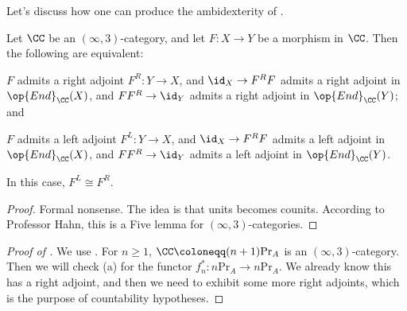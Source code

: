 \documentclass[../notes.tex]{subfiles}
\begin{document}
Let's discuss how one can produce the ambidexterity of .
\begin{proposition} \label{prop:get-ambi}
	Let $\CC$ be an $(\infty,3)$-category, and let $F\colon X\to Y$ be a morphism in $\CC$. Then the following are equivalent:
	\begin{listroman}
		\item $F$ admits a right adjoint $F^R\colon Y\to X$, and ${\id_X}\to F^RF$ admits a right adjoint in $\op{End}_\CC(X)$, and $FF^R\to\id_Y$ admits a right adjoint in $\op{End}_\CC(Y)$; and
		\item $F$ admits a left adjoint $F^L\colon Y\to X$, and ${\id_X}\to F^RF$ admits a left adjoint in $\op{End}_\CC(X)$, and $FF^R\to\id_Y$ admits a left adjoint in $\op{End}_\CC(Y)$.
	\end{listroman}
	In this case, $F^L\cong F^R$.
\end{proposition}
\begin{proof}
	Formal nonsense. The idea is that units becomes counits. According to Professor Hahn, this is a Five lemma for $(\infty,3)$-categories.
\end{proof}
\begin{proof}[Proof of ]
	We use . For $n\ge1$, $\CC\coloneqq(n+1)\mathrm{Pr}_A$ is an $(\infty,3)$-category. Then we will check (a) for the functor $f_n^*\colon n\mathrm{Pr}_A\to n\mathrm{Pr}_A$. We already know this has a right adjoint, and then we need to exhibit some more right adjoints, which is the purpose of countability hypotheses.
\end{proof}
\end{document}
